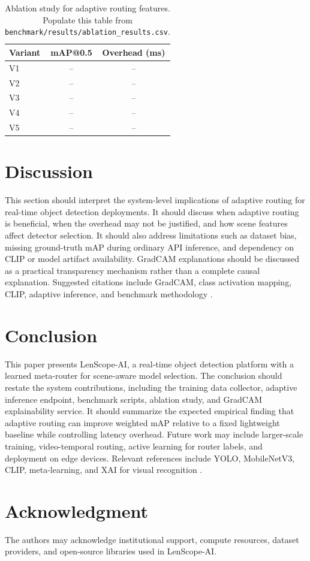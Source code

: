 \documentclass[conference]{IEEEtran}
\begin{document}
\begin{table}[t]
    \centering
    \caption{Ablation study for adaptive routing features. Populate this table from \texttt{benchmark/results/ablation\_results.csv}.}
    \label{tab:ablation}
    \begin{tabular}{lcc}
        \toprule
        Variant & mAP@0.5 & Overhead (ms) \\
        \midrule
        V1 & -- & -- \\
        V2 & -- & -- \\
        V3 & -- & -- \\
        V4 & -- & -- \\
        V5 & -- & -- \\
        \bottomrule
    \end{tabular}
\end{table}

\section{Discussion}
This section should interpret the system-level implications of adaptive routing for real-time object detection deployments. It should discuss when adaptive routing is beneficial, when the overhead may not be justified, and how scene features affect detector selection. It should also address limitations such as dataset bias, missing ground-truth mAP during ordinary API inference, and dependency on CLIP or model artifact availability. GradCAM explanations should be discussed as a practical transparency mechanism rather than a complete causal explanation. Suggested citations include GradCAM, class activation mapping, CLIP, adaptive inference, and benchmark methodology \cite{selvaraju2017gradcam,zhou2016cam,radford2021clip,graves2016adaptive,lin2014coco}.

\section{Conclusion}
This paper presents LenScope-AI, a real-time object detection platform with a learned meta-router for scene-aware model selection. The conclusion should restate the system contributions, including the training data collector, adaptive inference endpoint, benchmark scripts, ablation study, and GradCAM explainability service. It should summarize the expected empirical finding that adaptive routing can improve weighted mAP relative to a fixed lightweight baseline while controlling latency overhead. Future work may include larger-scale training, video-temporal routing, active learning for router labels, and deployment on edge devices. Relevant references include YOLO, MobileNetV3, CLIP, meta-learning, and XAI for visual recognition \cite{redmon2016yolo,howard2019mobilenetv3,radford2021clip,hochreiter2001learning,selvaraju2017gradcam}.

\section*{Acknowledgment}
The authors may acknowledge institutional support, compute resources, dataset providers, and open-source libraries used in LenScope-AI.



\end{document}
